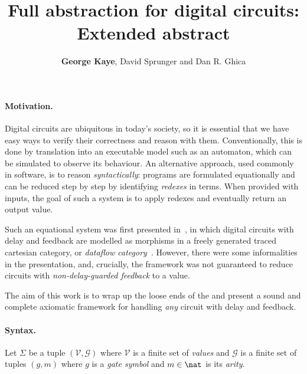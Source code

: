 \documentclass[10pt]{article}
\title{\vspace{-3em}Full abstraction for digital circuits: \textbf{Extended abstract}}
\author{\textbf{George Kaye}, David Sprunger and Dan R. Ghica}
\begin{document}
    \maketitle

    \paragraph*{Motivation.}
    Digital circuits are ubiquitous in today's society, so it is essential that we have easy ways to verify their correctness and reason with them.
    Conventionally, this is done by translation into an executable model such as an automaton, which can be simulated to observe its behaviour.
    An alternative approach, used commonly in software, is to reason \emph{syntactically}: programs are formulated equationally and can be reduced step by step by identifying \emph{redexes} in terms.
    When provided with inputs, the goal of such a system is to apply redexes and eventually return an output value.

    Such an equational system was first presented in~\cite{ghica2016categorical,ghica2017diagrammatic}, in which digital circuits with delay and feedback are modelled as morphisms in a freely generated traced cartesian category, or \emph{dataflow category}~\cite{cazanescu1990new,cazanescu1994feedback}.
    However, there were some informalities in the presentation, and, crucially, the framework was not guaranteed to reduce circuits with \emph{non-delay-guarded feedback} to a value.

    The aim of this work is to wrap up the loose ends of the and present a sound and complete axiomatic framework for handling \emph{any} circuit with delay and feedback.

    \paragraph*{Syntax.}

    \begin{definition}
        Let \(\Sigma\) be a tuple \((\mathcal{V},\mathcal{G})\) where \(\mathcal{V}\) is a finite set of \emph{values} and \(\mathcal{G}\) is a finite set of tuples \((g,m)\) where \(g\) is a \emph{gate symbol} and \(m \in \nat\) is its \emph{arity}.
    \end{definition}
\end{document}
